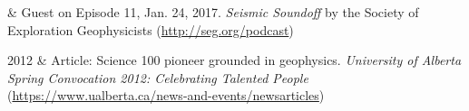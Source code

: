 \documentclass[a4paper, 11pt]{article}
\begin{document}
\begin{entryright}
 & Guest on Episode 11, Jan. 24, 2017. \emph{Seismic Soundoff} by the Society of Exploration Geophysicists (\href{http://seg.org/podcast/Post/4610/Episode-11-Geophysical-Electromagnetics-2017-DISC}{http://seg.org/podcast})
\end{entryright}

\begin{entryright}
2012 & Article: Science 100 pioneer grounded in geophysics. \emph{University of Alberta Spring Convocation 2012: Celebrating Talented People} (\href{https://www.ualberta.ca/news-and-events/newsarticles/2012/06/science100pioneergroundedingeophysics}{https://www.ualberta.ca/news-and-events/newsarticles})
\end{entryright}
\end{document}
